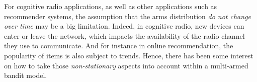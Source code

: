 

%
For cognitive radio applications, as well as other applications such as recommender systems, the assumption that the arms distribution \emph{do not change over time} may be a big limitation.
Indeed, in cognitive radio, new devices can enter or leave the network, which impacts the availability of the radio channel they use to communicate.
And for instance in online recommendation, the popularity of items is also subject to trends.
Hence, there has been some interest on how to take those \emph{non-stationary} aspects into account within a multi-armed bandit model.

